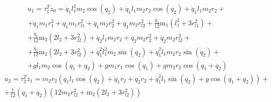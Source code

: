 \documentclass[a4paper,14pt]{extreport}
\begin{document}
\begin{eqnarray}
u_{1} = \tau_{1}^{T} z_{0} = \ddot{q}_1 l_{1}^{2} m_{2} \cos{\left (q_{2} \right )}
+ \ddot{q}_1 l_{1} m_{2} r_{2} \cos{\left (q_{2} \right )} + \ddot{q}_1 l_{1} m_{2} r_{2} +\nonumber\\
+ \ddot{q}_1 m_{1} r_{1}^{2} + \ddot{q}_1 m_{1} r_{l1}^{2} + \ddot{q}_1 m_{2} r_{2}^{2}
+ \ddot{q}_1 m_{2} r_{l2}^{2} + \frac{\ddot{q}_1}{12} \operatorname{m_{1}}{\left (l_{1}^{2} + 3 r_{l1}^{2} \right )} +\nonumber\\
+ \frac{\ddot{q}_1}{12} \operatorname{m_{2}}{\left (2 l_{2} + 3 r_{l2}^{2} \right )} + \ddot{q}_2 l_{1} m_{2} r_{2} + \ddot{q}_2 m_{2} r_{2}^{2} + \ddot{q}_2 m_{2} r_{l2}^{2} +\nonumber\\
+ \frac{\ddot{q}_2}{12} \operatorname{m_{2}}{\left (2 l_{2} + 3 r_{l2}^{2} \right )}
+ \dot{q}_1^{2} l_{1}^{2} m_{2} \sin{\left (q_{2} \right )} + \dot{q}_1^{2} l_{1} m_{2} r_{2} \sin{\left (q_{2} \right )} +\nonumber\\
+ g l_{1} m_{2} \cos{\left (q_{1} + q_{2} \right )} + g m_{1} r_{1} \cos{\left (q_{1} \right )} + g m_{2} r_{2} \cos{\left (q_{1} + q_{2} \right )} \nonumber
\end{eqnarray}
\begin{eqnarray}
u_{2} = \tau_{2}^{T} z_{1} = m_{2} r_{2} \left(\ddot{q}_1 l_{1} \cos{\left (q_{2} \right )} + \ddot{q}_1 r_{2} + \ddot{q}_2 r_{2} + \dot{q}_1^{2} l_{1} \sin{\left (q_{2} \right )} + g \cos{\left (q_{1} + q_{2} \right )}\right) +\nonumber\\
+ \frac{1}{12} \left(\ddot{q}_1 + \ddot{q}_2\right) \left(12 m_{2} r_{l2}^{2} + \operatorname{m_{2}}{\left (2 l_{2} + 3 r_{l2}^{2} \right )}\right) \nonumber
\end{eqnarray}
\end{document}
